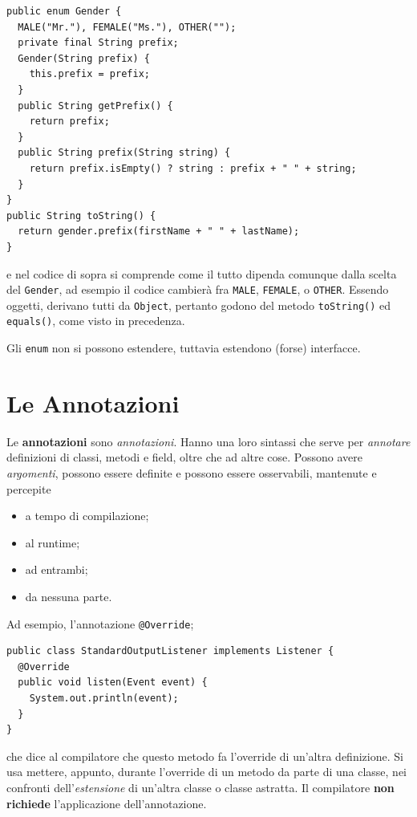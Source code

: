 \documentclass[\fontsizeclass,twocolumn]{\classname}
\theoremstyle{definition}
\theoremstyle{definition}
\begin{document}
\begin{lstlisting}
public enum Gender {
  MALE("Mr."), FEMALE("Ms."), OTHER("");
  private final String prefix;
  Gender(String prefix) {
    this.prefix = prefix;
  }
  public String getPrefix() {
    return prefix;
  }
  public String prefix(String string) {
    return prefix.isEmpty() ? string : prefix + " " + string;
  }
}
public String toString() {
  return gender.prefix(firstName + " " + lastName);
}
\end{lstlisting}

e nel codice di sopra si comprende come il tutto dipenda comunque dalla scelta
del \texttt{Gender}, ad esempio il codice cambierà fra \texttt{MALE},
\texttt{FEMALE}, o \texttt{OTHER}. Essendo oggetti, derivano tutti da
\texttt{Object}, pertanto godono del metodo \texttt{toString()} ed
\texttt{equals()}, come visto in precedenza.

Gli \texttt{enum} non si possono estendere, tuttavia estendono (forse)
interfacce.

\section{Le Annotazioni}

Le \textbf{annotazioni} sono \emph{annotazioni}. Hanno una loro sintassi che
serve per \emph{annotare} definizioni di classi, metodi e field, oltre che ad
altre cose. Possono avere \emph{argomenti}, possono essere definite e possono
essere osservabili, mantenute e percepite
\begin{itemize}
    \item a tempo di compilazione;
    \item al runtime;
    \item ad entrambi;
    \item da nessuna parte.
\end{itemize}

Ad esempio, l'annotazione \texttt{@Override};

\begin{lstlisting}
public class StandardOutputListener implements Listener {
  @Override
  public void listen(Event event) {
    System.out.println(event);
  }
}
\end{lstlisting}

che dice al compilatore che questo metodo fa l'override di un'altra
definizione. Si usa mettere, appunto, durante l'override di un metodo da parte
di una classe, nei confronti dell'\emph{estensione} di un'altra classe o classe
astratta. Il compilatore \textbf{non richiede} l'applicazione dell'annotazione.
\end{document}
